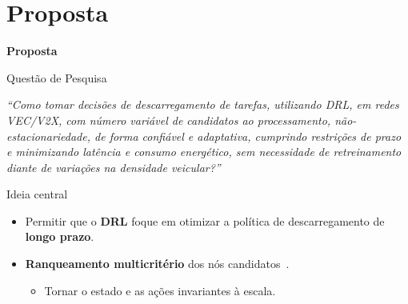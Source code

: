 \documentclass[aspectratio=169]{beamer}
\begin{document}
\section{Proposta}
\begin{frame}
    \centering
    \Huge \textbf{Proposta}
\end{frame}

\begin{frame}{Questão de Pesquisa}
    \vspace{1.5cm}
    \begin{center}
        \Large \textit{``Como tomar decisões de descarregamento de tarefas, utilizando DRL, em redes
VEC/V2X, com número variável de candidatos ao processamento, não-estacionariedade, de forma confiável e adaptativa, cumprindo restrições de prazo e minimizando latência e consumo energético, sem necessidade de retreinamento diante de variações na densidade veicular?''}
    \end{center}
\end{frame}

\begin{frame}{Ideia central}
    \begin{itemize}
        \item Permitir que o \textbf{DRL} foque em otimizar a política de descarregamento de \textbf{longo prazo}.
        \item \textbf{Ranqueamento multicritério} dos nós candidatos~\cite{hwang1981}.
        \begin{itemize}
            \item Tornar o estado e as ações invariantes à escala.
        \end{itemize}
    \end{itemize}
\end{frame}
\end{document}
